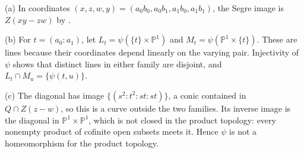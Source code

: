 (a) In coordinates $(x,z,w,y)=(a_0b_0,a_0b_1,a_1b_0,a_1b_1)$, the Segre image is $Z(xy-zw)$ by .

(b) For $t=(a_0:a_1)$, let $L_t=\psi(\{t\}\times\mathbb P^1)$ and $M_t=\psi(\mathbb P^1\times\{t\})$. These are lines because their coordinates depend linearly on the varying pair. Injectivity of $\psi$ shows that distinct lines in either family are disjoint, and $L_t\cap M_u=\{\psi(t,u)\}$.

(c) The diagonal has image $\{(s^2:t^2:st:st)\}$, a conic contained in $Q\cap Z(z-w)$, so this is a curve outside the two families. Its inverse image is the diagonal in $\mathbb P^1\times\mathbb P^1$, which is not closed in the product topology: every nonempty product of cofinite open subsets meets it. Hence $\psi$ is not a homeomorphism for the product topology.
